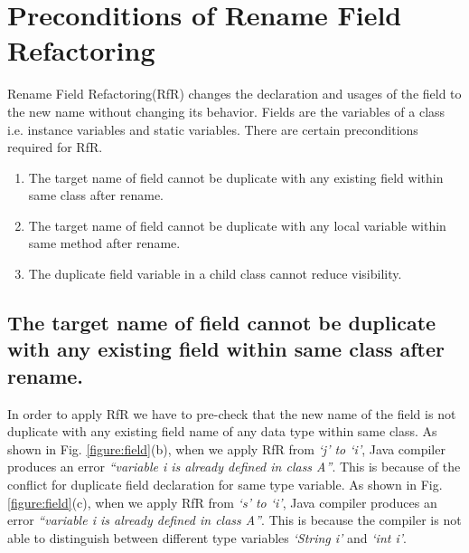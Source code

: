 \section{\textbf{Preconditions of Rename Field Refactoring}}
Rename Field Refactoring(RfR) changes the declaration and usages of the field to the new name without changing its behavior.
Fields are the variables of a class i.e. instance variables and static variables.
There are certain preconditions required for RfR.

\begin{enumerate}
	\item The target name of field cannot be duplicate with any existing field within same class after rename.
	\item The target name of field cannot be duplicate with any local variable within same method after rename.
	\item The duplicate field variable in a child class cannot reduce visibility. 
\end{enumerate}

\subsection{The target name of field cannot be duplicate with any existing field within same class after rename.}

In order to apply RfR we have to pre-check that the new name of the field is not duplicate with any existing field name of any data type within same class. As shown in Fig. \ref{figure:field}(b), when we apply RfR from \emph{`j' to `i'}, Java compiler produces an error \textit{``variable i is already defined in class A''}. This is because of the conflict for duplicate field declaration for same type variable. As shown in Fig. \ref{figure:field}(c), when we apply RfR from \emph{`s' to `i'}, Java compiler produces an error \textit{``variable i is already defined in class A''}. This is because the compiler is not able to distinguish between different type variables \emph{`String i'} and \emph{`int i'}.

